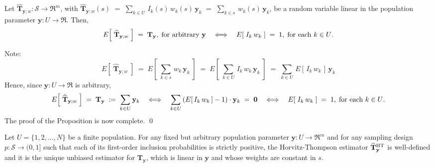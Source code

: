 \documentclass{article}
\begin{document}
\begin{proposition}
\label{proposition:Unbiasedness}
\mbox{}
\vskip 0.2cm
\noindent
Let $\widehat{\mathbf{T}}_{\mathbf{y};w} : \mathcal{S} \longrightarrow \Re^{m}$, with
$\widehat{\mathbf{T}}_{\mathbf{y};w}(s)$
$=$ $\underset{k \in U}{\sum}\,I_{k}(s)\,w_{k}(s)\,\mathbf{y}_{k}$
$=$ $\underset{k \in s}{\sum}\,w_{k}(s)\,\mathbf{y}_{k}$,
be a random variable linear in the population parameter
$\mathbf{y} : U \longrightarrow \Re$.
Then,
\begin{equation*}
E\!\left[\;\widehat{\mathbf{T}}_{\mathbf{y};w}\;\right] \; = \; \mathbf{T}_{\mathbf{y}},\;\textnormal{for arbitrary $\mathbf{y}$}
\quad\Longleftrightarrow\quad
E\!\left[\;I_{k}\,w_{k}\;\right] \; = \; 1,\;\textnormal{for each $k \in U$}.
\end{equation*}
\end{proposition}
\proof
Note:
\begin{equation*}
E\!\left[\;\widehat{\mathbf{T}}_{\mathbf{y};w}\;\right]
\;=\; E\!\left[\;\underset{k \in s}{\sum}\,w_{k}\,\mathbf{y}_{k}\;\right]
\;=\; E\!\left[\;\underset{k \in U}{\sum}\,I_{k}\,w_{k}\,\mathbf{y}_{k}\;\right]
\;=\; \underset{k \in U}{\sum}\,E\!\left[\,I_{k}\,w_{k}\,\right]\,\mathbf{y}_{k}
\end{equation*}
Hence, since $\mathbf{y} : U \longrightarrow \Re$ is arbitrary,
\begin{equation*}
E\!\left[\;\widehat{\mathbf{T}}_{\mathbf{y};w}\;\right] \;=\; \mathbf{T}_{\mathbf{y}} \; := \; \underset{k \in U}{\sum}\,\mathbf{y}_{k}
\quad\Longleftrightarrow\quad
\sum_{k \in U}\left(E\!\left[\,I_{k}\,w_{k}\,\right]-1\right)\cdot\mathbf{y}_{k} \; = \; \mathbf{0}
\quad\Longleftrightarrow\quad
E\!\left[\;I_{k}\,w_{k}\;\right] \; = \; 1,\;\textnormal{for each $k \in U$}.
\end{equation*}
The proof of the Proposition is now complete. \qed

\begin{corollary}
\mbox{}
\vskip 0.2cm
\noindent
Let $U = \{1,2,\ldots,N\}$ be a finite population.
For any fixed but arbitrary population parameter $\mathbf{y} : U \longrightarrow \Re^{m}$ and
for any sampling design $p : \mathcal{S} \longrightarrow (0,1]$ such that each of
its first-order inclusion probabilities is strictly positive,
the Horvitz-Thompson estimator $\widehat{\mathbf{T}}^{\textnormal{HT}}_{\mathbf{y}}$ is well-defined
and it is the unique unbiased estimator for $\mathbf{T}_{\mathbf{y}}$, which is linear in $\mathbf{y}$ and
whose weights are constant in $s$.
\end{corollary}
\end{document}
